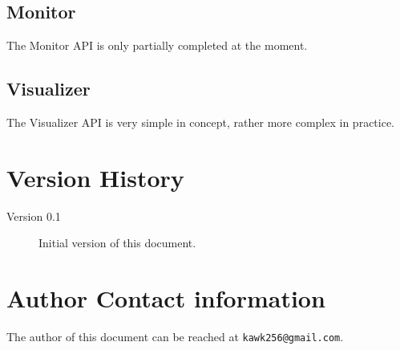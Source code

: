 \documentclass[a4paper,10pt]{report}
\begin{document}

\section{Monitor}
The Monitor API is only partially completed at the moment.
\section{Visualizer}
The Visualizer API is very simple in concept, rather more complex in practice.

\appendix

\chapter{Version History}
\begin{description}
 \item[Version 0.1] Initial version of this document.
\end{description}

\chapter{Author Contact information}
The author of this document can be reached at \texttt{kawk256@gmail.com}.
\end{document}
